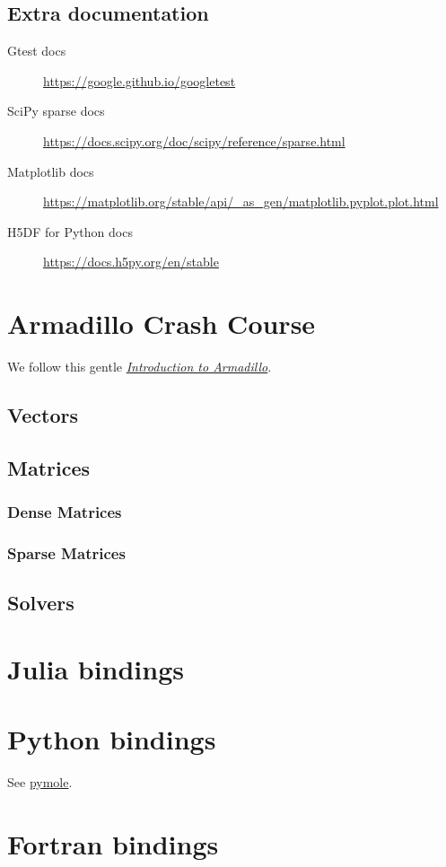 \section{Extra documentation}

\begin{description}
	\item[Gtest docs]

	      \url{https://google.github.io/googletest}

	\item[SciPy sparse docs]

	      \url{https://docs.scipy.org/doc/scipy/reference/sparse.html}

	\item[Matplotlib docs]

	      \url{https://matplotlib.org/stable/api/_as_gen/matplotlib.pyplot.plot.html}

	\item[H5DF for Python docs]
	      \url{https://docs.h5py.org/en/stable}
\end{description}

\chapter{Armadillo Crash Course}

We follow this gentle
\href{https://anderkve.github.io/FYS3150/book/introduction_to_cpp/intro_to_armadillo.html}{\emph{Introduction to Armadillo}}.

\section{Vectors}

\section{Matrices}

\subsection{Dense Matrices}

\subsection{Sparse Matrices}

\section{Solvers}

\chapter{Julia bindings}

\chapter{Python bindings}

See \href{% https://github.com/nutrik/pymole}{pymole}.

\chapter{Fortran bindings}

\nocite{*}
\printbibliography[title={References}]
